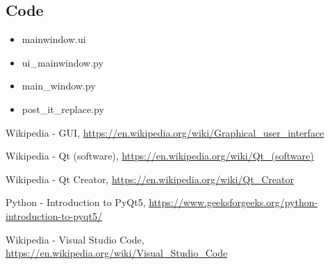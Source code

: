 \documentclass[a4paper, twoside]{report}
\begin{document}
{{\newpage
\subsection{Code}
\begin{itemize}
\item mainwindow.ui
\item ui{\_}mainwindow.py
\item main{\_}window.py
\item post{\_}it{\_}replace.py
\end{itemize}






\newpage
\begin{thebibliography}{1}

\begin{flushleft}
Wikipedia - GUI, \url{https://en.wikipedia.org/wiki/Graphical_user_interface}
\end{flushleft} 

\begin{flushleft}
Wikipedia - Qt (software), \newline \url{https://en.wikipedia.org/wiki/Qt_(software)}
\end{flushleft}

\begin{flushleft}
Wikipedia - Qt Creator, \newline \url{https://en.wikipedia.org/wiki/Qt_Creator}
\end{flushleft}

\begin{flushleft}
Python - Introduction to PyQt5, \newline \url{https://www.geeksforgeeks.org/python-introduction-to-pyqt5/}
\end{flushleft}

\begin{flushleft}
Wikipedia - Visual Studio Code, \newline \url{
https://en.wikipedia.org/wiki/Visual_Studio_Code}
\end{flushleft}



\end{thebibliography}}}
\end{document}
